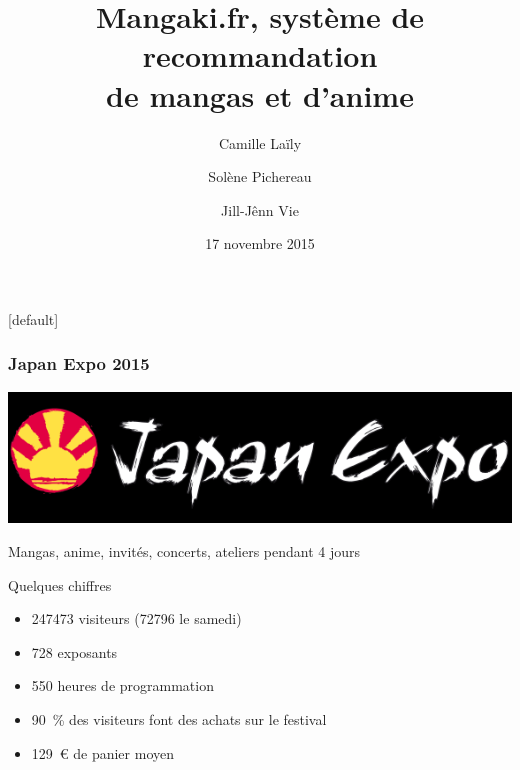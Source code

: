 \documentclass[handout]{beamer}
\title[]
{Mangaki.fr, système de recommandation\\de mangas et d'anime}
\author[]
{Camille Laïly \and Solène Pichereau \and Jill-Jênn Vie}
\institute[]
{Student Demo Cup}
\date
{17 novembre 2015}
\begin{document}

{
[default]
\begin{frame}
	\titlepage
\end{frame}
}

\begin{frame}
	\frametitle{Japan Expo 2015}
	\begin{center}
	\includegraphics[width=0.5\linewidth]{figures/japanexpo.png}\\
	\end{center}
	Mangas, anime, invités, concerts, ateliers pendant \alert{4 jours}
	\pause
	\begin{block}{Quelques chiffres}
	\begin{itemize}[<+->]
	\item 247473 visiteurs (72796 le samedi)
	\item 728 exposants
	\item 550 heures de programmation
	\item 90~\% des visiteurs font des achats sur le festival
	\item 129~\euro{} de panier moyen
	\end{itemize}
	\end{block}
\end{frame}
\end{document}
